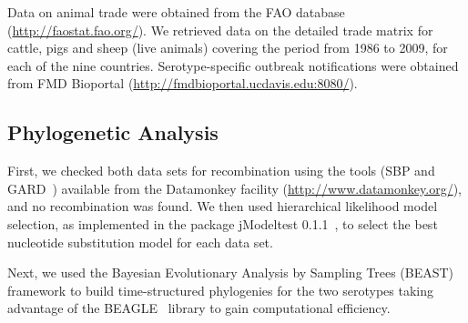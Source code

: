 \documentclass[10pt]{article}
\begin{document}
Data on animal trade were obtained from the FAO database (\url{http://faostat.fao.org/}).
We retrieved data on the detailed trade matrix for cattle, pigs and sheep (live animals) covering the period from 1986 to 2009, for each of the nine countries.
Serotype-specific outbreak notifications were obtained from FMD Bioportal (\url{http://fmdbioportal.ucdavis.edu:8080/}).

\subsection*{Phylogenetic Analysis}

First, we checked both data sets for recombination using the tools (SBP and GARD~\cite{sbpgard}) available from the Datamonkey facility (\url{http://www.datamonkey.org/}), and no recombination was found.
We then used hierarchical likelihood model selection, as implemented in the package jModeltest 0.1.1~\cite{jmodel}, to select the best nucleotide substitution model for each data set.

Next, we used the Bayesian Evolutionary Analysis by Sampling Trees (BEAST)~\cite{beast2012} framework to build time-structured phylogenies for the two serotypes taking advantage of the  BEAGLE~\cite{BEAGLE} library to gain computational efficiency.
\end{document}
